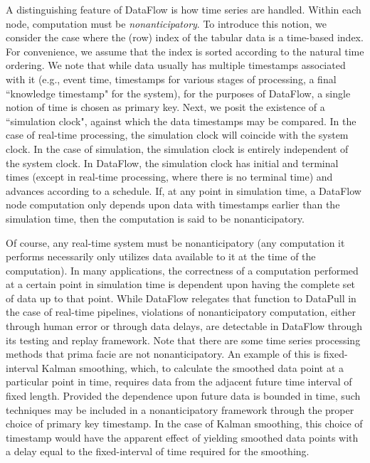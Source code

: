 \documentclass[11pt, reqno]{amsart}
\theoremstyle{definition}
\theoremstyle{remark}
\begin{document}
  A distinguishing feature of DataFlow is how time series are handled. Within
each node, computation must be \emph{nonanticipatory}. To introduce this
notion, we consider the case where the (row) index of the tabular data
is a time-based index. For convenience, we assume that the index is sorted
according to the natural time ordering. We note that while data usually has
multiple timestamps associated with it (e.g., event time, timestamps for
  various stages of processing, a final ``knowledge timestamp" for the system),
for the purposes of DataFlow, a single notion of time is chosen as primary
key. Next, we posit the existence of a ``simulation clock", against which
the data timestamps may be compared. In the case of real-time processing,
the simulation clock will coincide with the system clock. In the case of
simulation, the simulation clock is entirely independent of the system clock.
In DataFlow, the simulation clock has initial and terminal times (except in
real-time processing, where there is no terminal time) and advances according
to a schedule. If, at any point in simulation time, a DataFlow node computation
only depends upon data with timestamps earlier than the simulation time, then
the computation is said to be nonanticipatory.

Of course, any real-time system must be nonanticipatory (any computation it
performs necessarily only utilizes data available to it at the time of the
computation). In many applications, the correctness of a computation performed
at a certain point in simulation time is dependent upon having the complete
set of data up to that point. While DataFlow relegates that function to
DataPull in the case of real-time pipelines, violations of nonanticipatory
computation, either through human error or through data delays, are detectable
in DataFlow through its testing and replay framework. Note that there are some
time series processing methods that prima facie are not nonanticipatory. An
example of this is fixed-interval Kalman smoothing, which, to calculate the
smoothed data point at a particular point in time, requires data from the
adjacent future time interval of fixed length. Provided the dependence upon
future data is bounded in time, such techniques may be included in a
nonanticipatory framework through the proper choice of primary key timestamp.
In the case of Kalman smoothing, this choice of timestamp would have the
apparent effect of yielding smoothed data points with a delay equal to the
fixed-interval of time required for the smoothing.
\end{document}
